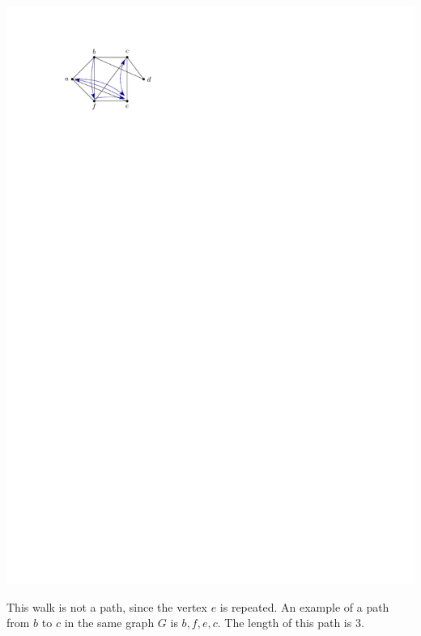 \begin{Example}
\begin{center}
\includegraphics{Images/Walk1.pdf}
\end{center}
This walk is not a path, since the vertex $e$ is repeated. An example of a path from $b$ to $c$ in the same graph $G$ is $b, f, e, c$. The length of this path is $3$.


\end{Example}
